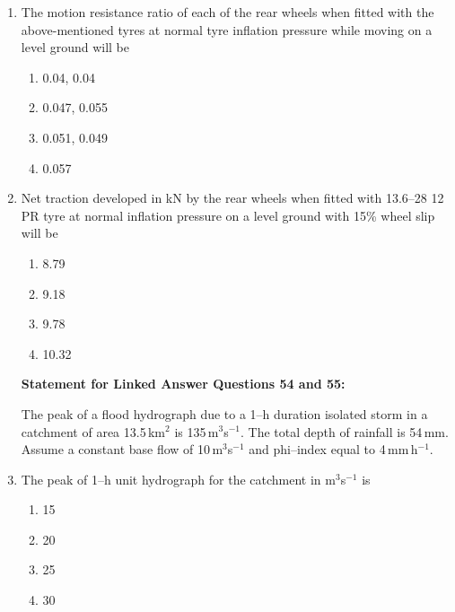 \documentclass[journal]{IEEEtran}
\numberwithin{equation}{enumi}
\numberwithin{figure}{enumi}
\begin{document}
\begin{enumerate}
    \item The motion resistance ratio of each of the rear wheels when fitted with the above-mentioned tyres at normal tyre inflation pressure while moving on a level ground will be
    \hfill{}
\begin{multicols}{4}
    \begin{enumerate}
    \item 0.04, 0.04
    \item 0.047, 0.055
    \item 0.051, 0.049
    \item 0.057
    \end{enumerate}
    \end{multicols}  




    \item Net traction developed in kN by the rear wheels when fitted with 13.6--28 12 PR tyre at normal inflation pressure on a level ground with 15\% wheel slip will be
     \hfill{}
\begin{multicols}{4}
    \begin{enumerate}
    \item  8.79
    \item 9.18
    \item 9.78
    \item 10.32
    \end{enumerate}
    \end{multicols}  



\textbf{Statement for Linked Answer Questions 54 and 55:}
\vspace{0.25cm}

The peak of a flood hydrograph due to a 1--h duration isolated storm in a catchment of area 13.5\,km$^2$ is 135\,m$^3$s$^{-1}$. The total depth of rainfall is 54\,mm. Assume a constant base flow of 10\,m$^3$s$^{-1}$ and phi--index equal to 4\,mm\,h$^{-1}$.


    \item The peak of 1--h unit hydrograph for the catchment in m$^3$s$^{-1}$ is
    \hfill{}
\begin{multicols}{4}
    \begin{enumerate}
    \item 15
    \item 20
    \item 25
    \item 30
    \end{enumerate}
    \end{multicols}  





\end{enumerate}
\end{document}
